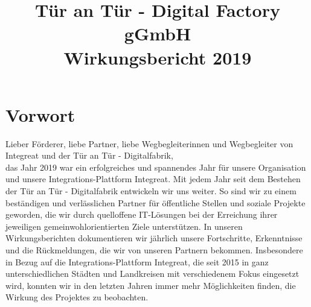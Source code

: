 \documentclass[12pt, a4paper]{article} %
\begin{document}
\title{
Tür an Tür - Digital Factory gGmbH\\
Wirkungsbericht 2019\\
} %

\AddToShipoutPicture*{\BackgroundPic}

\date{}

\maketitle
\thispagestyle{empty} %



\newpage
\tableofcontents

\newpage

\hypertarget{vorwort}{%
\section{Vorwort}\label{vorwort}}

Lieber Förderer, liebe Partner, liebe Wegbegleiterinnen und Wegbegleiter
von Integreat und der Tür an Tür - Digitalfabrik,\\

das Jahr 2019 war ein erfolgreiches und spannendes Jahr für unsere
Organisation und unsere Integrations-Plattform Integreat. Mit jedem Jahr
seit dem Bestehen der Tür an Tür - Digitalfabrik entwickeln wir uns
weiter. So sind wir zu einem beständigen und verlässlichen Partner für
öffentliche Stellen und soziale Projekte geworden, die wir durch
quelloffene IT-Lösungen bei der Erreichung ihrer jeweiligen
gemeinwohlorientierten Ziele unterstützen. In unseren Wirkungsberichten
dokumentieren wir jährlich unsere Fortschritte, Erkenntnisse und die
Rückmeldungen, die wir von unseren Partnern bekommen. Insbesondere in
Bezug auf die Integrations-Plattform Integreat, die seit 2015 in ganz
unterschiedlichen Städten und Landkreisen mit verschiedenem Fokus
eingesetzt wird, konnten wir in den letzten Jahren immer mehr
Möglichkeiten finden, die Wirkung des Projektes zu beobachten.
\end{document}
